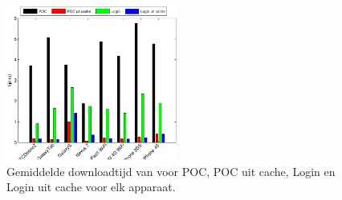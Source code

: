 \begin{figure}[H]
  \centering
  \includegraphics[width=0.5\textwidth]{figuren/performance-lungo.pdf}
  \caption{Gemiddelde downloadtijd van \lungo{} voor POC,  POC uit cache,  Login en Login uit cache voor elk apparaat.}
  \label{fig:performantie-lungo}
\end{figure}
